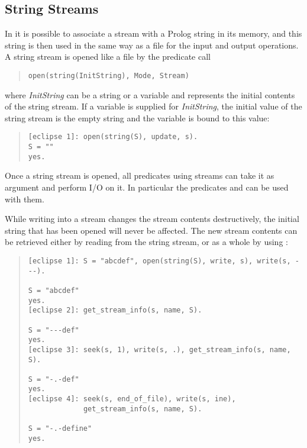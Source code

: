 \subsection{String Streams}
\label{stringio}
In {\eclipse} it is possible to associate a stream with a Prolog string
in its memory, and this string is then used in the same way as a file
for the input and output operations.
A string stream is opened like a file by the  predicate call
\begin{quote}\begin{verbatim}
open(string(InitString), Mode, Stream)
\end{verbatim}\end{quote}
where {\it InitString} can be a {\eclipse} string or a variable and represents
the initial contents of the string stream.
If a variable is supplied for {\it InitString}, the initial value of the string
stream is the empty string and the variable is bound to this value:
\begin{quote}\begin{verbatim}
[eclipse 1]: open(string(S), update, s).
S = ""
yes.
\end{verbatim}\end{quote} 
Once a string stream is opened, all predicates using streams
can take it as argument and perform I/O on it.
In particular the predicates
 and
can be used with them.

While writing into a stream changes the stream contents destructively,
the initial string that has been opened will never be affected.
The new stream contents can be retrieved either by reading from the string
stream, or as a whole by using
:
\begin{quote}\begin{verbatim}
[eclipse 1]: S = "abcdef", open(string(S), write, s), write(s, ---).

S = "abcdef"
yes.
[eclipse 2]: get_stream_info(s, name, S).

S = "---def"
yes.
[eclipse 3]: seek(s, 1), write(s, .), get_stream_info(s, name, S).

S = "-.-def"
yes.
[eclipse 4]: seek(s, end_of_file), write(s, ine),
             get_stream_info(s, name, S).

S = "-.-define"
yes.
\end{verbatim}\end{quote}


